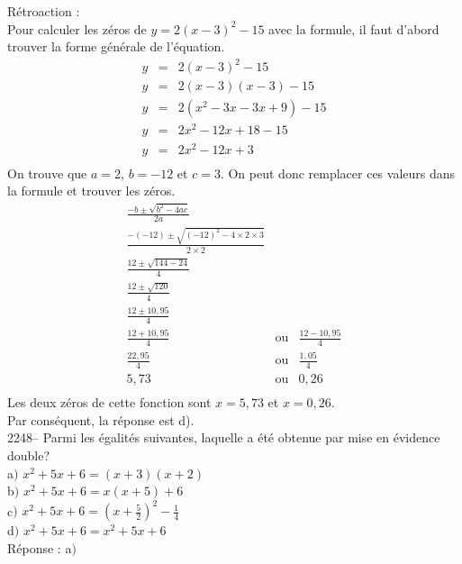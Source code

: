 \documentclass[letterpaper, 12pt]{article}
\begin{document}
R\'etroaction :\\
Pour calculer les z\'eros de $y=2(x-3)^{2}-15$ avec la formule, il faut d'abord trouver la forme g\'en\'erale de l'\'equation.
\begin{eqnarray*}
 y&=&2(x-3)^{2}-15\\
 y&=&2(x-3)(x-3)-15\\
 y&=&2(x^{2}-3x-3x+9)-15\\
 y&=&2x^{2}-12x+18-15\\
 y&=&2x^{2}-12x+3\\
\end{eqnarray*}
On trouve que $a=2$, $b=-12$ et $c=3$. On peut donc remplacer ces valeurs dans la formule et trouver les z\'eros.
\begin{eqnarray*}
 \frac{-b\pm\sqrt{b^{2}-4ac}}{2a}\\
 \frac{-(-12)\pm\sqrt{(-12)^{2}-4\times 2 \times 3}}{2\times 2}\\
 \frac{12\pm\sqrt{144-24}}{4}\\
 \frac{12\pm\sqrt{120}}{4}\\
 \frac{12\pm10,95}{4}\\
 \frac{12+10,95}{4} &\textrm{ou}& \frac{12-10,95}{4}\\
 \frac{22,95}{4} &\textrm{ou}& \frac{1,05}{4}\\
5,73 &\textrm{ou}& 0,26\\
\end{eqnarray*}
Les deux z\'eros de cette fonction sont $x=5,73$ et $x=0,26$.\\
Par cons\'equent, la r\'eponse est d).\\

2248-- Parmi les \'egalit\'es suivantes, laquelle a \'et\'e obtenue par mise en \'evidence double?\\

a$)$ $x^{2}+5x+6 = (x+3)(x+2)$\\[2mm]
b$)$ $x^{2}+5x+6 = x(x+5)+6$\\[2mm]
c$)$ $x^{2}+5x+6 = (x+\frac{5}{2})^{2}-\frac{1}{4}$\\[2mm]
d$)$ $x^{2}+5x+6 = x^{2}+5x+6$\\[2mm]

R\'eponse : a$)$\\
\end{document}
